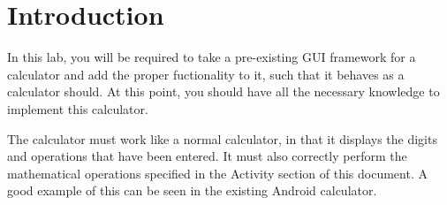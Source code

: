 \section{Introduction}

In this lab, you will be required to take a pre-existing GUI framework for a calculator and add the proper fuctionality to it, such that it behaves as a calculator should. At this point, you should have all the necessary knowledge to implement this calculator. 

The calculator must work like a normal calculator, in that it displays the digits and operations that have been entered. It must also correctly perform the mathematical operations specified in the Activity section of this document. A good example of this can be seen in the existing Android calculator.
